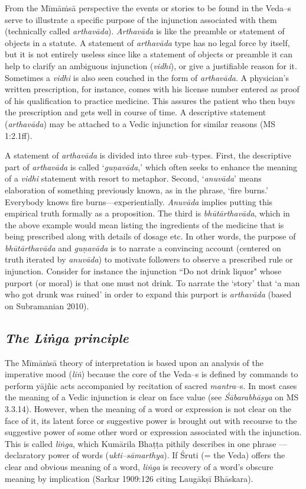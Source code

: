 From the Mīmāṁsā perspective the events or stories to be found in the Veda–s serve to illustrate a specific purpose of the injunction associated with them (technically called \textit{arthavāda}). \textit{Arthavāda} is like the preamble or statement of objects in a statute. A statement of \textit{arthavāda} type has no legal force by itself, but it is not entirely useless since like a statement of objects or preamble it can help to clarify an ambiguous injunction (\textit{vidhi}), or give a justifiable reason for it. Sometimes a \textit{vidhi} is also seen couched in the form of \textit{arthavāda}. A physician’s written prescription, for instance, comes with his license number entered as proof of his qualification to practice medicine. This assures the patient who then buys the prescription and gets well in course of time. A descriptive statement (\textit{arthavāda}) may be attached to a Vedic injunction for similar reasons (MS 1:2.1ff).

A statement of \textit{arthavāda} is divided into three sub–types. First, the descriptive part of \textit{arthavāda} is called ‘\textit{guṇavāda},’ which often seeks to enhance the meaning of a \textit{vidhi} statement with resort to metaphor. Second, ‘\textit{anuvāda}’ means elaboration of something previously known, as in the phrase, ‘fire burns.’ Everybody knows fire burns—experientially. \textit{Anuvāda} implies putting this empirical truth formally as a proposition. The third is \textit{bhūtārthavāda}, which in the above example would mean listing the ingredients of the medicine that is being prescribed along with details of dosage etc. In other words, the purpose of \textit{bhūtārthavāda} and \textit{guṇavāda} is to narrate a convincing account (centered on truth iterated by \textit{anuvāda}) to motivate followers to observe a prescribed rule or injunction. Consider for instance the injunction ``Do not drink liquor" whose purport (or moral) is that one must not drink. To narrate the ‘story’ that ‘a man who got drunk was ruined’ in order to expand this purport is \textit{arthavāda} (based on Subramanian 2010).


\subsection*{\textit{The Liṅga principle}}

The Mīmāṁsā theory of interpretation is based upon an analysis of the imperative mood (\textit{liṅ}) because the core of the Veda–s is defined by commands to perform yājñic acts accompanied by recitation of sacred \textit{mantra}–s. In most cases the meaning of a Vedic injunction is clear on face value (see \textit{Śābarabhāṣya} on MS 3.3.14). However, when the meaning of a word or expression is not clear on the face of it, its latent force or suggestive power is brought out with recourse to the suggestive power of some other word or expression associated with the injunction. This is called \textit{liṅga}, which Kumārila Bhaṭṭa pithily describes in one phrase — declaratory power of words (\textit{ukti–sāmarthya}). If Śruti (= the Veda) offers the clear and obvious meaning of a word, \textit{liṅga} is recovery of a word’s obscure meaning by implication (Sarkar 1909:126 citing Laugākṣī Bhāskara).


